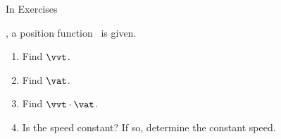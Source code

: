 {\noindent In Exercises}
{ , a position function \vrt\ is given.
\begin{enumerate}
\item Find $\vvt$.
\item Find $\vat$.
\item Find $\vvt \cdot \vat$.
\item Is the speed constant?  If so, determine the constant speed.
\end{enumerate}
}
